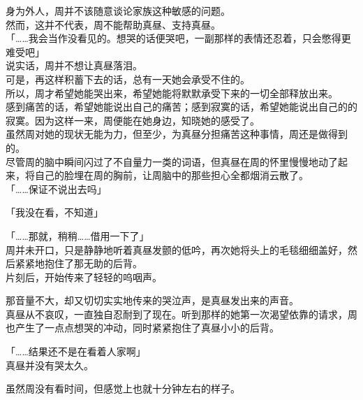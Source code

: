 身为外人，周并不该随意谈论家族这种敏感的问题。\\

然而，这并不代表，周不能帮助真昼、支持真昼。\\

「……我会当作没看见的。想哭的话便哭吧，一副那样的表情还忍着，只会憋得更难受吧」\\

说实话，周并不想让真昼落泪。\\

可是，再这样积蓄下去的话，总有一天她会承受不住的。\\

所以，周才希望她能哭出来，希望她能将默默承受下来的一切全部释放出来。\\

感到痛苦的话，希望她能说出自己的痛苦；感到寂寞的话，希望她能说出自己的的寂寞。因为这样一来，周便能在她身边，知晓她的感受了。\\

虽然周对她的现状无能为力，但至少，为真昼分担痛苦这种事情，周还是做得到的。\\

尽管周的脑中瞬间闪过了不自量力一类的词语，但真昼在周的怀里慢慢地动了起来，将自己的脸埋在周的胸前，让周脑中的那些担心全都烟消云散了。\\

「……保证不说出去吗」

「我没在看，不知道」

「……那就，稍稍……借用一下了」\\

周并未开口，只是静静地听着真昼发颤的低吟，再次她将头上的毛毯细细盖好，然后紧紧地抱住了那无助的后背。\\

片刻后，开始传来了轻轻的呜咽声。

那音量不大，却又切切实实地传来的哭泣声，是真昼发出来的声音。\\

真昼从不哀叹，一直独自忍耐到了现在。听到那样的她第一次渴望依靠的请求，周也产生了一点点想哭的冲动，同时紧紧抱住了真昼小小的后背。\\

\vspace{2\baselineskip}

「……结果还不是在看着人家啊」\\

真昼并没有哭太久。

虽然周没有看时间，但感觉上也就十分钟左右的样子。\\


